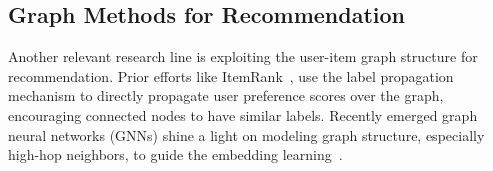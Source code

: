 \subsection{Graph Methods for Recommendation}
Another relevant research line is exploiting the user-item graph structure for recommendation.
Prior efforts like ItemRank~\cite{ItemRank}, %
use the label propagation mechanism to directly propagate user preference scores over the graph, \ie encouraging connected nodes to have similar labels.
Recently emerged graph neural networks (GNNs) shine a light on modeling graph structure, especially high-hop neighbors, to guide the embedding learning~\cite{GCN,GraphSAGE}.
